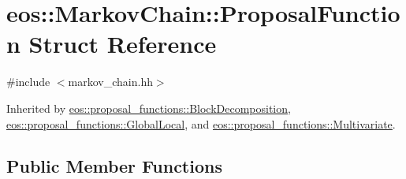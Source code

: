 \hypertarget{structeos_1_1MarkovChain_1_1ProposalFunction}{
\section{eos::MarkovChain::ProposalFunction Struct Reference}
\label{structeos_1_1MarkovChain_1_1ProposalFunction}
}


{\ttfamily \#include $<$markov\_\-chain.hh$>$}

Inherited by \hyperlink{classeos_1_1proposal__functions_1_1BlockDecomposition}{eos::proposal\_\-functions::BlockDecomposition}, \hyperlink{classeos_1_1proposal__functions_1_1GlobalLocal}{eos::proposal\_\-functions::GlobalLocal}, and \hyperlink{classeos_1_1proposal__functions_1_1Multivariate}{eos::proposal\_\-functions::Multivariate}.\subsection*{Public Member Functions}
